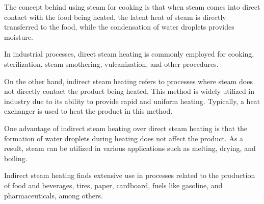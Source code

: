 The concept behind using steam for cooking is that when steam comes into direct contact with the food being heated, the latent heat of steam is directly transferred to the food, while the condensation of water droplets provides moisture.

In industrial processes, direct steam heating is commonly employed for cooking, sterilization, steam smothering, vulcanization, and other procedures.

On the other hand, indirect steam heating refers to processes where steam does not directly contact the product being heated. This method is widely utilized in industry due to its ability to provide rapid and uniform heating. Typically, a heat exchanger is used to heat the product in this method.

One advantage of indirect steam heating over direct steam heating is that the formation of water droplets during heating does not affect the product. As a result, steam can be utilized in various applications such as melting, drying, and boiling.

Indirect steam heating finds extensive use in processes related to the production of food and beverages, tires, paper, cardboard, fuels like gasoline, and pharmaceuticals, among others.

